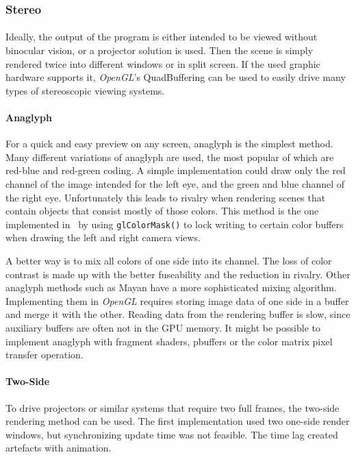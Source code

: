\subsubsection{Stereo\label{RendStereo}}
\paragraph{}
Ideally, the output of the program is either intended to be viewed without binocular vision, or a projector solution is used.
Then the scene is simply rendered twice into different windows or in split screen.
If the used graphic hardware supports it, \textit{OpenGL}'s QuadBuffering can be used to easily drive many types of stereoscopic viewing systems.

\paragraph{Anaglyph}
For a quick and easy preview on any screen, anaglyph is the simplest method.
Many different variations of anaglyph are used, the most popular of which are red-blue and red-green coding.
A simple implementation could draw only the red channel of the image intended for the left eye, and the green and blue channel of the right eye.
Unfortunately this leads to rivalry when rendering scenes that contain objects that consist mostly of those colors.
This method is the one implemented in \ER\ by using \lstinline{glColorMask()} to lock writing to certain color buffers when drawing the left and right camera views.

A better way is to mix all colors of one side into its channel.
The loss of color contrast is made up with the better fuseability and the reduction in rivalry.
Other anaglyph methods such as Mayan\cite{Mayan} have a more sophisticated mixing algorithm.
Implementing them in \textit{OpenGL} requires storing image data of one side in a buffer and merge it with the other.
Reading data from the rendering buffer is slow, since auxiliary buffers are often not in the GPU memory.
It might be possible to implement anaglyph with fragment shaders, pbuffers or the color matrix pixel transfer operation.

\paragraph{Two-Side}
To drive projectors or similar systems that require two full frames, the two-side rendering method can be used.
The first implementation used two one-side render windows, but synchronizing update time was not feasible.
The time lag created artefacts with animation.

